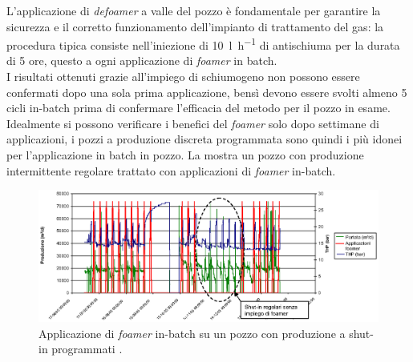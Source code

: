 L'applicazione di \textit{defoamer} a valle del pozzo è fondamentale per garantire la sicurezza e il corretto funzionamento dell'impianto di trattamento del gas: la procedura tipica consiste nell'iniezione di \SI{10}{\litre\per\hour} di antischiuma per la durata di 5 ore, questo a ogni applicazione di \textit{foamer} in batch.\\
I risultati ottenuti grazie all'impiego di schiumogeno non possono essere confermati dopo una sola prima applicazione, bensì devono essere svolti almeno 5 cicli in-batch prima di confermare l'efficacia del metodo per il pozzo in esame. Idealmente si possono verificare i benefici del \textit{foamer} solo dopo settimane di applicazioni, i pozzi a produzione discreta programmata sono quindi i più idonei per l'applicazione in batch in pozzo. La  mostra un pozzo con produzione intermittente regolare trattato con applicazioni di \textit{foamer} in-batch.

\begin{figure}[htbp]
    \centering
    \includegraphics[width=\textwidth]{fig/foamer/batch-cycle.eps}
    \caption{Applicazione di \textit{foamer} in-batch su un pozzo con produzione a shut-in programmati \parencite{wittfeld2015foam}.}
    \label{fig:bacth-cycle}
\end{figure}

